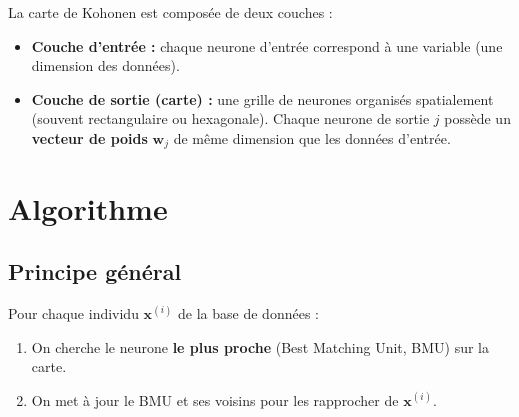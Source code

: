 \documentclass[a4paper,11pt]{article}
\theoremstyle{definition}
\begin{document}
La carte de Kohonen est composée de deux couches :

\begin{itemize}
    \item \textbf{Couche d'entrée :} chaque neurone d'entrée correspond à une variable (une dimension des données).
    \item \textbf{Couche de sortie (carte) :} une grille de neurones organisés spatialement (souvent rectangulaire ou hexagonale). Chaque neurone de sortie $j$ possède un \textbf{vecteur de poids} $\mathbf{w}_j$ de même dimension que les données d'entrée.
\end{itemize}

\begin{center}
\end{center}

\section{Algorithme}

\subsection{Principe général}

Pour chaque individu $\mathbf{x}^{(i)}$ de la base de données :
\begin{enumerate}
    \item On cherche le neurone \textbf{le plus proche} (Best Matching Unit, BMU) sur la carte.
    \item On met à jour le BMU et ses voisins pour les rapprocher de $\mathbf{x}^{(i)}$.
\end{enumerate}
\end{document}
